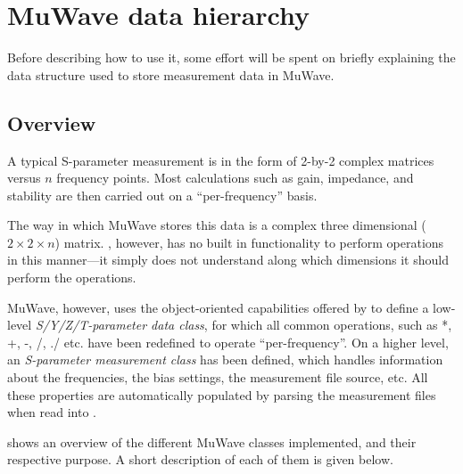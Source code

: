 %

\section{MuWave data hierarchy} %
Before describing how to use it, some effort will be spent on
briefly explaining the data structure used to store measurement
data in MuWave.

\subsection{Overview}
A typical S-parameter measurement is in the form of 2-by-2 complex
matrices versus $n$ frequency points. Most calculations such as
gain, impedance, and stability are then carried out on a
``per-frequency'' basis.

The way in which MuWave stores this data is a complex three
dimensional ($2 \times 2\times n$) matrix. \matlab, however, has
no built in functionality to perform operations in this
manner---it simply does not understand along which dimensions it
should perform the operations.

MuWave, however, uses the object-oriented capabilities offered by
\matlab to define a low-level \emph{S/Y/Z/T-parameter data class},
for which all common \matlab operations, such as *, +, -, /, ./
etc. have been redefined to operate ``per-frequency''. On a higher
level, an \emph{S-parameter measurement class} has been defined,
which handles information about the frequencies, the bias
settings, the measurement file source, etc. All these properties
are automatically populated by parsing the measurement files when
read into \matlab.

 shows an overview of the different MuWave
classes implemented, and their respective purpose. A short
description of each of them is given below.

